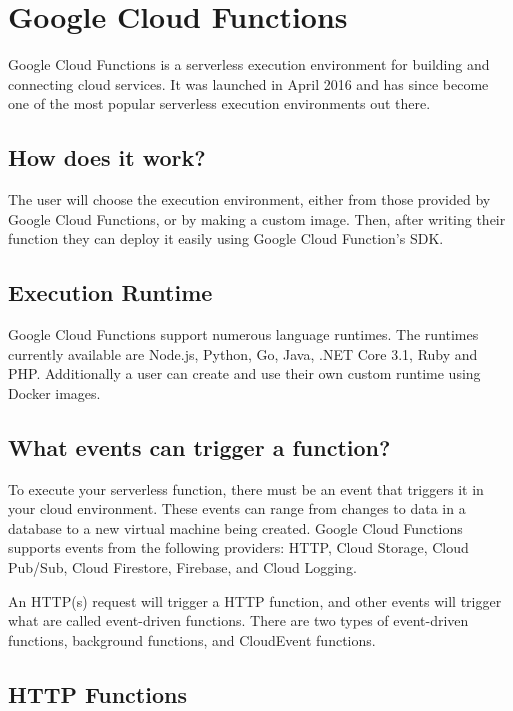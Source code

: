 \documentclass[10pt, conference]{IEEEtran}
\begin{document}
\section{Google Cloud Functions}

Google Cloud Functions is a serverless execution environment for building and connecting cloud services. It was launched in April 2016 and has since become one of the most popular serverless execution environments out there. 

\subsection{How does it work?}

The user will choose the execution environment, either from those provided by Google Cloud Functions, or by making a custom image. Then, after writing their function they can deploy it easily using Google Cloud Function's SDK. 

\subsection{Execution Runtime}

Google Cloud Functions support numerous language runtimes. The runtimes currently available are Node.js, Python, Go, Java, .NET Core 3.1, Ruby and PHP. Additionally a user can create and use their own custom runtime using Docker images. 

\subsection{What events can trigger a function?}

To execute your serverless function, there must be an event that triggers it in your cloud environment. These events can range from changes to data in a database to a new virtual machine being created. Google Cloud Functions supports events from the following providers: HTTP, Cloud Storage, Cloud Pub/Sub, Cloud Firestore, Firebase, and Cloud Logging.

An HTTP(s) request will trigger a HTTP function, and other events will trigger what are called event-driven functions. There are two types of event-driven functions, background functions, and CloudEvent functions. 

\subsection{HTTP Functions}
\end{document}
